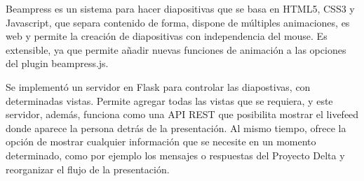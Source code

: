 
\begin{conclusions}

	Beampress es un sistema para hacer diapositivas que se basa en HTML5, CSS3 y Javascript, que separa contenido de forma, dispone de múltiples animaciones, es web y permite la creación de diapositivas con independencia del mouse. Es extensible, ya que permite añadir nuevas funciones de animación a las opciones del plugin beampress.js.

	Se implementó un servidor en Flask para controlar las diapostivas, con determinadas vistas. Permite agregar todas las vistas que se requiera, y este servidor, además, funciona como una API REST que posibilita mostrar el livefeed donde aparece la persona detrás de la presentación. Al mismo tiempo, ofrece la opción de mostrar cualquier información que se necesite en un momento determinado, como por ejemplo los mensajes o respuestas del Proyecto Delta y reorganizar el flujo de la presentación.

\end{conclusions}
